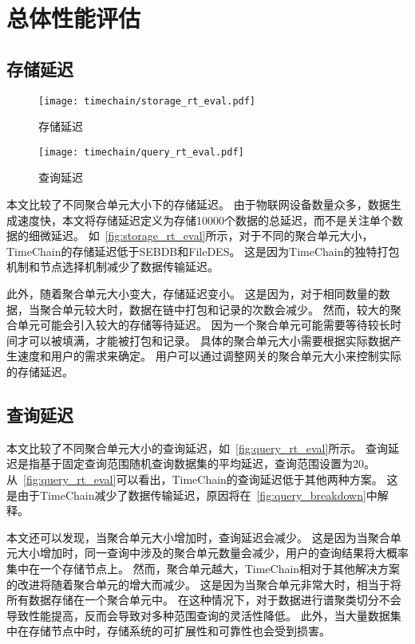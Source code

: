 \section{总体性能评估}

\subsection{存储延迟}
\begin{figure*}[t]
    \centering
	\begin{minipage}{0.48\linewidth}
        \centering
        \texttt{[image: timechain/storage\_rt\_eval.pdf]}
        \caption{存储延迟}
        \label{fig:storage_rt_eval}
    \end{minipage}
    \quad
    \begin{minipage}{0.48\linewidth}
        \centering
        \texttt{[image: timechain/query\_rt\_eval.pdf]}
        \caption{查询延迟}
        \label{fig:query_rt_eval}
	\end{minipage}
\end{figure*}
本文比较了不同聚合单元大小下的存储延迟。
由于物联网设备数量众多，数据生成速度快，本文将存储延迟定义为存储10000个数据的总延迟，而不是关注单个数据的细微延迟。
如~\autoref{fig:storage_rt_eval}所示，对于不同的聚合单元大小，TimeChain的存储延迟低于SEBDB和FileDES。
这是因为TimeChain的独特打包机制和节点选择机制减少了数据传输延迟。

此外，随着聚合单元大小变大，存储延迟变小。
这是因为，对于相同数量的数据，当聚合单元较大时，数据在链中打包和记录的次数会减少。
然而，较大的聚合单元可能会引入较大的存储等待延迟。
因为一个聚合单元可能需要等待较长时间才可以被填满，才能被打包和记录。
具体的聚合单元大小需要根据实际数据产生速度和用户的需求来确定。
用户可以通过调整网关的聚合单元大小来控制实际的存储延迟。

\subsection{查询延迟}
本文比较了不同聚合单元大小的查询延迟，如~\autoref{fig:query_rt_eval}所示。
查询延迟是指基于固定查询范围随机查询数据集的平均延迟，查询范围设置为20。
从~\autoref{fig:query_rt_eval}可以看出，TimeChain的查询延迟低于其他两种方案。
这是由于TimeChain减少了数据传输延迟，原因将在~\autoref{fig:query_breakdown}中解释。

本文还可以发现，当聚合单元大小增加时，查询延迟会减少。
这是因为当聚合单元大小增加时，同一查询中涉及的聚合单元数量会减少，用户的查询结果将大概率集中在一个存储节点上。
然而，聚合单元越大，TimeChain相对于其他解决方案的改进将随着聚合单元的增大而减少。
这是因为当聚合单元非常大时，相当于将所有数据存储在一个聚合单元中。
在这种情况下，对于数据进行谱聚类切分不会导致性能提高，反而会导致对多种范围查询的灵活性降低。
此外，当大量数据集中在存储节点中时，存储系统的可扩展性和可靠性也会受到损害。

